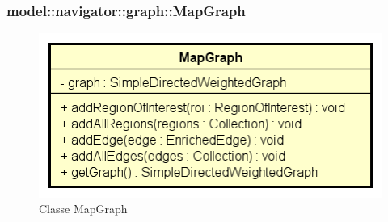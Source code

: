 \documentclass[../DefinizioneDiProdotto.tex]{subfiles}
\begin{document}
\subsubsection{model::navigator::graph::MapGraph}

    \begin{figure}[H]
        \centering
        \includegraphics{img/MapGraph.png}
        \caption{Classe MapGraph}\label{fig:model::navigator::graph::MapGraph} 
    \end{figure}
\end{document}
